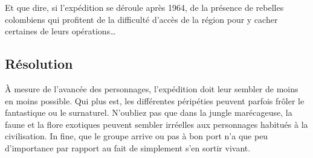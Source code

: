 Et que dire, si l'expédition se déroule après 1964, de la présence de rebelles colombiens qui profitent de la difficulté d'accès de la région pour y cacher certaines de leurs opérations\dots

\subsection{Résolution}

À mesure de l'avancée des personnages, l'expédition doit leur sembler de moins en moins possible.
Qui plus est, les différentes péripéties peuvent parfois frôler le fantastique ou le surnaturel.
N'oubliez pas que dans la jungle marécageuse, la faune et la flore exotiques peuvent sembler irréelles aux personnages habitués à la civilisation.
In fine, que le groupe arrive ou pas à bon port n'a que peu d'importance par rapport au fait de simplement s'en sortir vivant.
